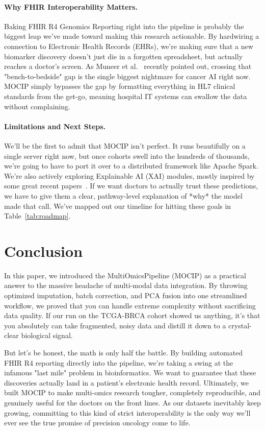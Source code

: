 \documentclass[runningheads]{llncs}
\begin{document}
\paragraph{Why FHIR Interoperability Matters.}
Baking FHIR R4 Genomics Reporting right into the pipeline is probably the biggest leap we've made toward making this research actionable. By hardwiring a connection to Electronic Health Records (EHRs), we're making sure that a new biomarker discovery doesn't just die in a forgotten spreadsheet, but actually reaches a doctor's screen. As Muneer et al.~\cite{muneer2025review} recently pointed out, crossing that "bench-to-bedside" gap is the single biggest nightmare for cancer AI right now. MOCIP simply bypasses the gap by formatting everything in HL7 clinical standards from the get-go, meaning hospital IT systems can swallow the data without complaining.

\paragraph{Limitations and Next Steps.}
We'll be the first to admit that MOCIP isn't perfect. It runs beautifully on a single server right now, but once cohorts swell into the hundreds of thousands, we're going to have to port it over to a distributed framework like Apache Spark. We're also actively exploring Explainable AI (XAI) modules, mostly inspired by some great recent papers~\cite{Leiser2023XAIOmics}. If we want doctors to actually trust these predictions, we have to give them a clear, pathway-level explanation of *why* the model made that call. We've mapped out our timeline for hitting these goals in Table~\ref{tab:roadmap}.

\section{Conclusion}

In this paper, we introduced the MultiOmicsPipeline (MOCIP) as a practical answer to the massive headache of multi-modal data integration. By throwing optimized imputation, batch correction, and PCA fusion into one streamlined workflow, we proved that you can handle extreme complexity without sacrificing data quality. If our run on the TCGA-BRCA cohort showed us anything, it's that you absolutely can take fragmented, noisy data and distill it down to a crystal-clear biological signal.

But let's be honest, the math is only half the battle. By building automated FHIR R4 reporting directly into the pipeline, we're taking a swing at the infamous "last mile" problem in bioinformatics. We want to guarantee that these discoveries actually land in a patient's electronic health record. Ultimately, we built MOCIP to make multi-omics research tougher, completely reproducible, and genuinely useful for the doctors on the front lines. As our datasets inevitably keep growing, committing to this kind of strict interoperability is the only way we'll ever see the true promise of precision oncology come to life.
\end{document}
